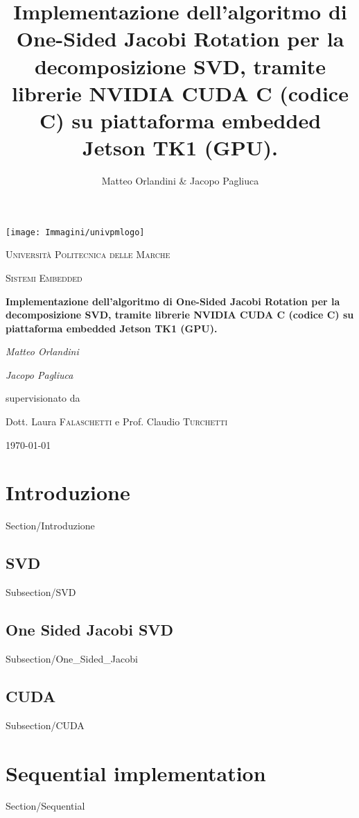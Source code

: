 \documentclass[12pt,a4paper,titlepage]{article}
\title{Implementazione dell'algoritmo di One-Sided Jacobi Rotation per la decomposizione SVD, tramite librerie NVIDIA CUDA C (codice C) su piattaforma embedded Jetson TK1 (GPU).}
\author{Matteo Orlandini \& Jacopo Pagliuca}
\date{}
\begin{document}
\begin{titlepage}
	
	\centering
	\texttt{[image: Immagini/univpmlogo]}\par\vspace{1cm}
	{\scshape\LARGE Università Politecnica delle Marche\par}
	\vspace{1cm}
	{\scshape\Large Sistemi Embedded\par}
	\vspace{1.5cm}
	{\huge\bfseries Implementazione dell'algoritmo di One-Sided Jacobi Rotation per la decomposizione SVD, tramite librerie NVIDIA CUDA C (codice C) su piattaforma embedded Jetson TK1 (GPU). \par}
	\vspace{2cm}
	{\Large\itshape Matteo Orlandini \par}
	{\Large\itshape Jacopo Pagliuca\par}
	\vfill
	supervisionato da\par
	Dott. Laura \textsc{Falaschetti} e Prof. Claudio \textsc{Turchetti}
	
	\vfill
	
	{\large \today\par}
\end{titlepage}

\section{Introduzione}
 {Section/Introduzione}

\subsection{SVD}
 {Subsection/SVD}

\subsection{One Sided Jacobi SVD}
 {Subsection/One_Sided_Jacobi}

\subsection{CUDA}
 {Subsection/CUDA}

\newpage
\section{Sequential implementation}
 {Section/Sequential}
\end{document}
